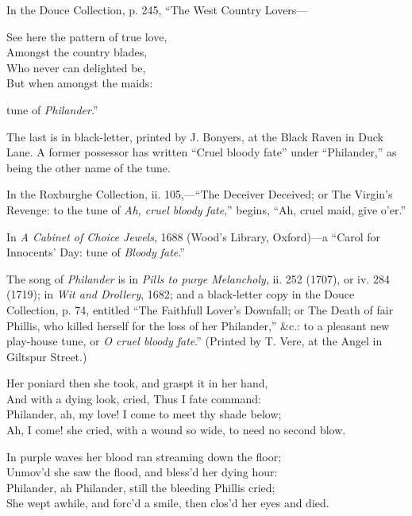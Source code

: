 In the Douce Collection, p. 245, “The West Country Lovers—
\begin{scverse}
\begin{altverse}
See here the pattern of true love,\\
Amongst the country blades,\\
Who never can delighted be,\\
But when amongst the maids:
\end{altverse}
\end{scverse}
tune of \textit{Philander}.”

The last is in black-letter, printed by J. Bonyers, at the Black Raven in Duck
Lane. A former possessor has written “Cruel bloody fate” under “Philander,”
as being the other name of the tune.

In the Roxburghe Collection, ii. 105,—“The Deceiver Deceived; or The
Virgin’s Revenge: to the tune of \textit{Ah, cruel bloody fate},” begins, “Ah, cruel maid,
give o’er.”

In \textit{A Cabinet of Choice Jewels}, 1688 (Wood’s Library, Oxford)—a “Carol for
Innocents’ Day: tune of \textit{Bloody fate}.”
\pagebreak

The song of \textit{Philander} is in \textit{ Pills to purge Melancholy}, ii. 252 (1707), or
iv. 284 (1719); in \textit{Wit and Drollery}, 1682; and a black-letter copy in the
Douce Collection, p. 74, entitled “The Faithfull Lover’s Downfall; or The
Death of fair Phillis, who killed herself for the loss of her Philander,” \&c.: to a
pleasant new play-house tune, or \textit{O cruel bloody fate}.” (Printed by T. Vere, at
the Angel in Giltspur Street.)



\settowidth{\versewidth}{Ah, I come! she cried, with a wound so wide, to need no second blow.}
\begin{scverse}Her poniard then she took, and graspt it in her hand,\\
And with a dying look, cried, Thus I fate command:\\
Philander, ah, my love! I come to meet thy shade below;\\
Ah, I come! she cried, with a wound so wide, to need no second blow.

In purple waves her blood ran streaming down the floor;\\
Unmov’d she saw the flood, and bless’d her dying hour:\\
Philander, ah Philander, still the bleeding Phillis cried;\\
She wept awhile, and forc’d a smile, then clos’d her eyes and died.
\end{scverse}

